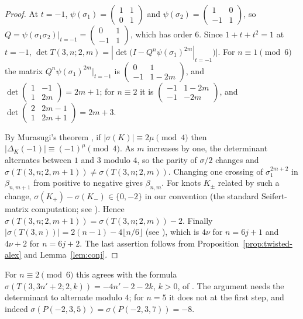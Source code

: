 \begin{proof}
At $t=-1$, $\psi(\sigma_1)=\begin{pmatrix}1&1\\0&1\end{pmatrix}$ and $\psi(\sigma_2)=\begin{pmatrix}1&0\\-1&1\end{pmatrix}$, so
$Q=\psi(\sigma_1\sigma_2)|_{t=-1}=\begin{pmatrix}0&1\\-1&1\end{pmatrix}$, which has order $6$. Since $1+t+t^2=1$ at $t=-1$,
$\det T(3,n;2,m)=|\det(I-Q^n\psi(\sigma_1)^{2m}|_{t=-1})|$. For $n\equiv1\pmod6$ the matrix
$Q^n\psi(\sigma_1)^{2m}|_{t=-1}$ is $\begin{pmatrix}0&1\\-1&1-2m\end{pmatrix}$, and
$\det\begin{pmatrix}1&-1\\1&2m\end{pmatrix}=2m+1$; for $n\equiv2$ it is $\begin{pmatrix}-1&1-2m\\-1&-2m\end{pmatrix}$, and
$\det\begin{pmatrix}2&2m-1\\1&2m+1\end{pmatrix}=2m+3$.

By Murasugi's theorem \cite[Thm.~5.6]{Murasugi}, if $|\sigma(K)|\equiv2\mu\pmod4$ then
$|\Delta_K(-1)|\equiv(-1)^\mu\pmod4$. As $m$ increases by one, the determinant alternates between $1$ and
$3$ modulo $4$, so the parity of $\sigma/2$ changes and $\sigma(T(3,n;2,m+1))\ne\sigma(T(3,n;2,m))$. Changing
one crossing of $\sigma_1^{2m+2}$ in $\beta_{n,m+1}$ from positive to negative gives $\beta_{n,m}$. For knots
$K_\pm$ related by such a change, $\sigma(K_+)-\sigma(K_-)\in\{0,-2\}$ in our convention (the standard
Seifert-matrix computation; see \cite[p.~163]{DS24}). Hence $\sigma(T(3,n;2,m+1))=\sigma(T(3,n;2,m))-2$.
Finally $|\sigma(T(3,n))|=2(n-1)-4\lfloor n/6\rfloor$ \cite{Litherland} (see \cite[proof of Prop.~6.3]{WuebbenV}),
which is $4\nu$ for $n=6j+1$ and $4\nu+2$ for $n=6j+2$. The last assertion follows from
Proposition~\ref{prop:twisted-alex} and Lemma~\ref{lem:conj}.
\end{proof}

For $n\equiv2\pmod6$ this agrees with the formula $\sigma(T(3,3n'+2;2,k))=-4n'-2-2k$, $k>0$, of
\cite[p.~163]{DS24}. The argument needs the determinant to alternate modulo $4$; for $n=5$ it does not at the
first step, and indeed $\sigma(P(-2,3,5))=\sigma(P(-2,3,7))=-8$.

